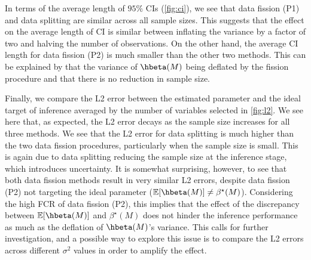 In terms of the average length of $95\%$ CIs (\cref{fig:ci}), we see that data fission (P1) and data splitting are similar across all sample sizes. This suggests that the effect on the average length of CI is similar between inflating the variance by a factor of two and halving the number of observations. On the other hand, the average CI length for data fission (P2) is much smaller than the other two methods. This can be explained by that the variance of $\hbeta(M)$ being deflated by the fission procedure and that there is no reduction in sample size.

Finally, we compare the L2 error between the estimated parameter and the ideal target of inference averaged by the number of variables selected in \cref{fig:l2}. We see here that, as expected, the L2 error decays as the sample size increases for all three methods. We see that the L2 error for data splitting is much higher than the two data fission procedures, particularly when the sample size is small. This is again due to data splitting reducing the sample size at the inference stage, which introduces uncertainty. It is somewhat surprising, however, to see that both data fission methods result in very similar L2 errors, despite data fission (P2) not targeting the ideal parameter ($\EE[\hbeta(M)] \neq \beta^\star(M)$). Considering the high FCR of data fission (P2), this implies that the effect of the discrepancy between $\EE[\hbeta(M)]$ and $\beta^\star(M)$ does not hinder the inference performance as much as the deflation of $\hbeta(M)$'s variance. This calls for further investigation, and a possible way to explore this issue is to compare the L2 errors across different $\sigma^2$ values in order to amplify the effect.